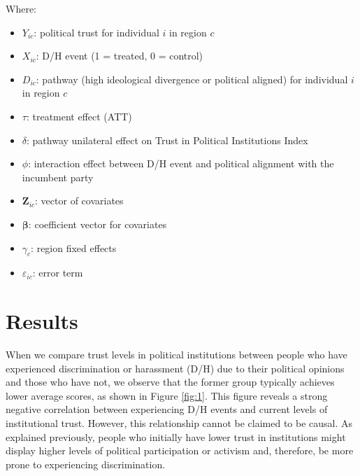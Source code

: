 \documentclass{article}
\begin{document}
  Where:
  \begin{itemize}
    \item \( Y_{ic} \): political trust for individual \( i \) in region \( c \)
    \item \( X_{ic} \): D/H event (1 = treated, 0 = control)
    \item \( D_{ic} \): pathway (high ideological divergence or political aligned) for individual \( i \) in region \( c \)
    \item \( \tau \): treatment effect (ATT)
    \item \( \delta \): pathway unilateral effect on Trust in Political Institutions Index
    \item \( \phi \): interaction effect between D/H event and political alignment with the incumbent party
    \item \( \mathbf{Z}_{ic} \): vector of covariates
    \item \( \mathbf{\beta} \): coefficient vector for covariates
    \item \( \gamma_c \): region fixed effects
    \item \( \varepsilon_{ic} \): error term
  \end{itemize}

\section{Results}

When we compare trust levels in political institutions between people who have experienced discrimination or harassment (D/H) due to their political opinions and those who have not, we observe that the former group typically achieves lower average scores, as shown in Figure \ref{fig:1}. This figure reveals a strong negative correlation between experiencing D/H events and current levels of institutional trust. However, this relationship cannot be claimed to be causal. As explained previously, people who initially have lower trust in institutions might display higher levels of political participation or activism and, therefore, be more prone to experiencing discrimination.
\end{document}
